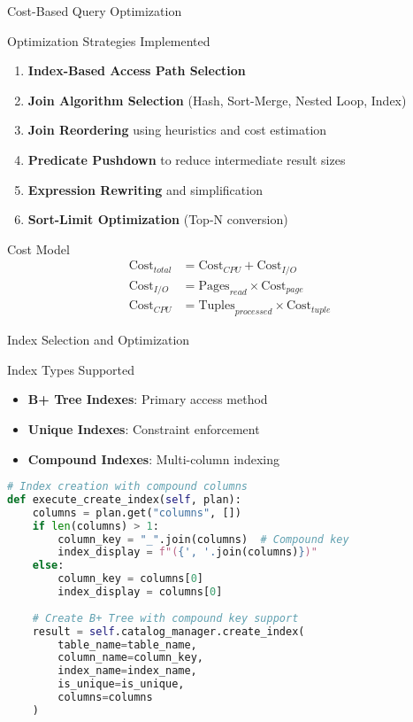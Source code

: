 \documentclass[aspectratio=169]{beamer}
\begin{document}
\begin{frame}{Cost-Based Query Optimization}
\begin{block}{Optimization Strategies Implemented}
\begin{enumerate}
    \item \textbf{Index-Based Access Path Selection}
    \item \textbf{Join Algorithm Selection} (Hash, Sort-Merge, Nested Loop, Index)
    \item \textbf{Join Reordering} using heuristics and cost estimation
    \item \textbf{Predicate Pushdown} to reduce intermediate result sizes
    \item \textbf{Expression Rewriting} and simplification
    \item \textbf{Sort-Limit Optimization} (Top-N conversion)
\end{enumerate}
\end{block}

\begin{block}{Cost Model}
\begin{align}
\text{Cost}_{total} &= \text{Cost}_{CPU} + \text{Cost}_{I/O} \\
\text{Cost}_{I/O} &= \text{Pages}_{read} \times \text{Cost}_{page} \\
\text{Cost}_{CPU} &= \text{Tuples}_{processed} \times \text{Cost}_{tuple}
\end{align}
\end{block}
\end{frame}

\begin{frame}[fragile]{Index Selection and Optimization}
\begin{block}{Index Types Supported}
\begin{itemize}
    \item \textbf{B+ Tree Indexes}: Primary access method
    \item \textbf{Unique Indexes}: Constraint enforcement
    \item \textbf{Compound Indexes}: Multi-column indexing
\end{itemize}
\end{block}

\begin{lstlisting}[language=Python]
# Index creation with compound columns
def execute_create_index(self, plan):
    columns = plan.get("columns", [])
    if len(columns) > 1:
        column_key = "_".join(columns)  # Compound key
        index_display = f"({', '.join(columns)})"
    else:
        column_key = columns[0]
        index_display = columns[0]
        
    # Create B+ Tree with compound key support
    result = self.catalog_manager.create_index(
        table_name=table_name,
        column_name=column_key,
        index_name=index_name,
        is_unique=is_unique,
        columns=columns
    )
\end{lstlisting}
\end{frame}
\end{document}
